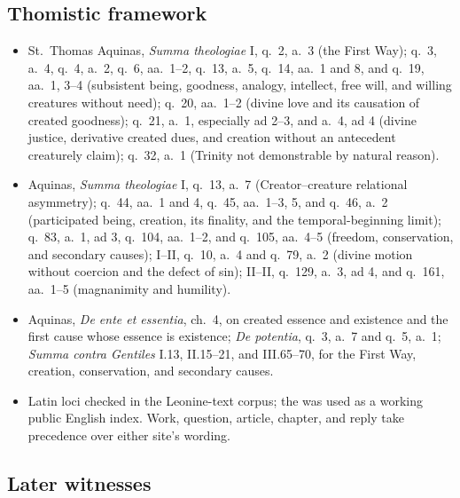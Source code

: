 \subsection*{Thomistic framework}

{\fontsize{8.6}{9.6}\selectfont
\begin{itemize}[itemsep=0pt,parsep=0pt,topsep=0.05em]
\item St.~Thomas Aquinas, \emph{Summa theologiae} I, q.~2, a.~3 (the First Way); q.~3, a.~4, q.~4, a.~2, q.~6, aa.~1--2, q.~13, a.~5, q.~14, aa.~1 and 8, and q.~19, aa.~1, 3--4 (subsistent being, goodness, analogy, intellect, free will, and willing creatures without need); q.~20, aa.~1--2 (divine love and its causation of created goodness); q.~21, a.~1, especially ad 2--3, and a.~4, ad 4 (divine justice, derivative created dues, and creation without an antecedent creaturely claim); q.~32, a.~1 (Trinity not demonstrable by natural reason).
\item Aquinas, \emph{Summa theologiae} I, q.~13, a.~7 (Creator--creature relational asymmetry); q.~44, aa.~1 and 4, q.~45, aa.~1--3, 5, and q.~46, a.~2 (participated being, creation, its finality, and the temporal-beginning limit); q.~83, a.~1, ad 3, q.~104, aa.~1--2, and q.~105, aa.~4--5 (freedom, conservation, and secondary causes); I--II, q.~10, a.~4 and q.~79, a.~2 (divine motion without coercion and the defect of sin); II--II, q.~129, a.~3, ad 4, and q.~161, aa.~1--5 (magnanimity and humility).
\item Aquinas, \emph{De ente et essentia}, ch.~4, on created essence and existence and the first cause whose essence is existence; \emph{De potentia}, q.~3, a.~7 and q.~5, a.~1; \emph{Summa contra Gentiles} I.13, II.15--21, and III.65--70, for the First Way, creation, conservation, and secondary causes.
\item Latin loci checked in the  Leonine-text corpus; the  was used as a working public English index. Work, question, article, chapter, and reply take precedence over either site's wording.
\end{itemize}}

\subsection*{Later witnesses}

